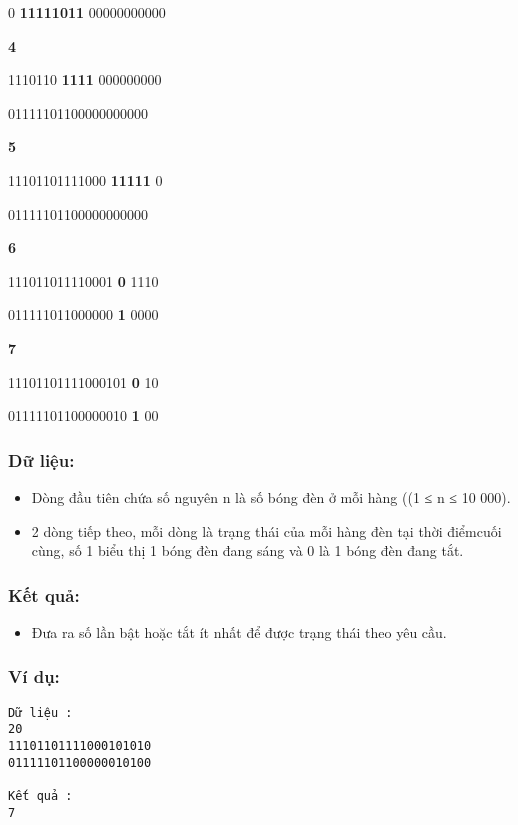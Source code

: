          0         \textbf{          11111011         }         00000000000                          

\textbf{          4         }

         1110110         \textbf{          1111         }         000000000                          

         01111101100000000000                          

\textbf{          5         }

         11101101111000         \textbf{          11111         }         0                          

         01111101100000000000                          

\textbf{          6         }

         111011011110001         \textbf{          0         }         1110                          

         011111011000000         \textbf{          1         }         0000                          

\textbf{          7         }

         11101101111000101         \textbf{          0         }         10                          

         01111101100000010         \textbf{          1         }         00                          









\subsubsection{   Dữ liệu:  }
\begin{itemize}
	\item     Dòng đầu tiên chứa số nguyên n là số bóng đèn ở mỗi hàng ((1 ≤ n ≤ 10 000).   
	\item     2 dòng tiếp theo, mỗi dòng là trạng thái của mỗi hàng đèn tại thời điểmcuối cùng, số 1 biểu thị 1 bóng đèn đang sáng và 0 là 1 bóng đèn đang tắt.   
\end{itemize}

\subsubsection{   Kết quả:  }
\begin{itemize}
	\item     Đưa ra số lần bật hoặc tắt ít nhất để được trạng thái theo yêu cầu.   
\end{itemize}

\subsubsection{   Ví dụ:  }
\begin{verbatim}
Dữ liệu :
20
11101101111000101010
01111101100000010100

Kết quả :
7
\end{verbatim}